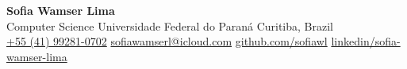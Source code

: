 \documentclass[10pt, a4paper]{article}
\newcommand{\csep}{\quad{\color{soft}\textbf{|}}\quad}
\begin{document}
\pagestyle{empty}
\setlength{\parskip}{0pt}

\begin{center}
    {\sffamily\Huge\bfseries\color{accent} Sofia Wamser Lima}\\[0.35em]
    {\sffamily\small\color{muted}
        Computer Science \textbullet{} Universidade Federal do Paran\'a \textbullet{} Curitiba, Brazil}\\[0.4em]
    {\small
        \href{tel:+5541992810702}{+55 (41) 99281-0702}
        \csep
        \href{mailto:sofiawamserl@icloud.com}{sofiawamserl@icloud.com}
        \csep
        \href{https://github.com/sofiawl}{github.com/sofiawl}
        \csep
        \href{https://linkedin.com/in/sofia-wamser-lima-ba7362288}{linkedin/sofia-wamser-lima}
    }
\end{center}
\vspace{-0.3em}

\end{document}
